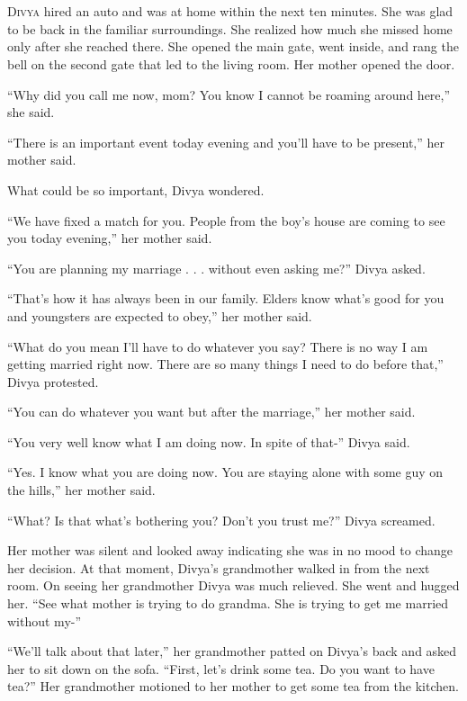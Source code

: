 \chapter{}

\lettrine{D}{ivya} hired an auto and was at home within the next ten minutes. She was glad to
be back in the familiar surroundings. She realized how much she missed home only
after she reached there. She opened the main gate, went inside, and rang the
bell on the second gate that led to the living room. Her mother opened the door.

“Why did you call me now, mom? You know I cannot be roaming around here,” she
said.

“There is an important event today evening and you'll have to be present,” her
mother said.

What could be so important, Divya wondered.

“We have fixed a match for you. People from the boy's house are coming to see
you today evening,” her mother said.

“You are planning my marriage . . . without even asking me?” Divya asked.

“That's how it has always been in our family. Elders know what's good for you
and youngsters are expected to obey,” her mother said.

“What do you mean I'll have to do whatever you say? There is no way I am getting
married right now. There are so many things I need to do before that,” Divya
protested.

“You can do whatever you want but after the marriage,” her mother said.

“You very well know what I am doing now. In spite of that-” Divya said.

“Yes. I know what you are doing now. You are staying alone with some guy on the
hills,” her mother said.

“What? Is that what's bothering you? Don't you trust me?” Divya screamed.

Her mother was silent and looked away indicating she was in no mood to change
her decision. At that moment, Divya's grandmother walked in from the next room.
On seeing her grandmother Divya was much relieved. She went and hugged her. “See
what mother is trying to do grandma. She is trying to get me married without
my-”

“We'll talk about that later,” her grandmother patted on Divya's back and asked
her to sit down on the sofa. “First, let's drink some tea. Do you want to have
tea?” Her grandmother motioned to her mother to get some tea from the kitchen.

